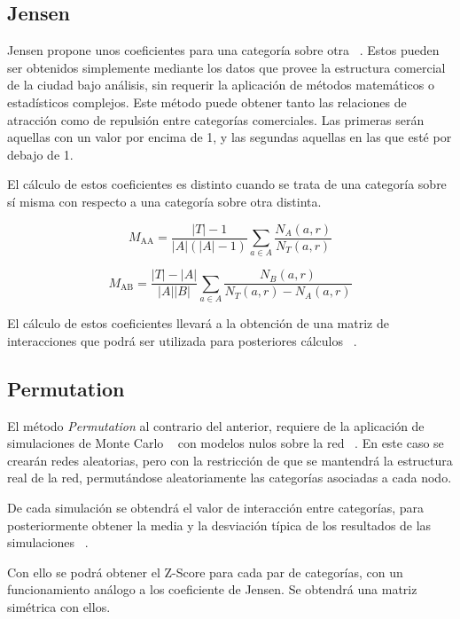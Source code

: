 \subsection{Jensen}


Jensen propone unos coeficientes para una categoría sobre otra ~\cite{Jensen2006}. Estos pueden ser obtenidos simplemente mediante los datos que provee la estructura comercial de la ciudad bajo análisis, sin requerir la aplicación de métodos matemáticos o estadísticos complejos. Este método puede obtener tanto las relaciones de atracción como de repulsión entre categorías comerciales. Las primeras serán aquellas con un valor por encima de 1, y las segundas aquellas en las que esté por debajo de 1.

El cálculo de estos coeficientes es distinto cuando se trata de una categoría sobre sí misma con respecto a una categoría sobre otra distinta.

\begin{equation*}
	M_\text{AA} = \frac{|T| - 1}{|A|(|A|-1)} \sum_{a \in A}\frac{N_A(a,r)}{N_T(a,r)}
\end{equation*}

\begin{equation*}
	M_\text{AB} = \frac{|T| - |A|}{|A||B|} \sum_{a \in A}\frac{N_B(a,r)}{N_T(a,r) - N_A(a,r)}
\end{equation*}

El cálculo de estos coeficientes llevará a la obtención de una matriz de interacciones que podrá ser utilizada para posteriores cálculos ~\cite{Jensen2006}.

\subsection{Permutation}

El método \textit{Permutation} al contrario del anterior, requiere de la aplicación de simulaciones de Monte Carlo ~\cite{Montecarlo} con modelos nulos sobre la red ~\cite{Ahedo2021,RSVAJSSHJG}. En este caso se crearán redes aleatorias, pero con la restricción de que se mantendrá la estructura real de la red, permutándose aleatoriamente las categorías asociadas a cada nodo.

De cada simulación se obtendrá el valor de interacción entre categorías, para posteriormente obtener la media y la desviación típica de los resultados de las simulaciones ~\cite{Ahedo2021,RSVAJSSHJG}.

Con ello se podrá obtener el Z-Score para cada par de categorías, con un funcionamiento análogo a los coeficiente de Jensen. Se obtendrá una matriz simétrica con ellos.

